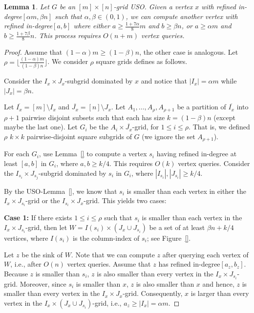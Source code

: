 \documentclass[a4paper,10pt]{article}
\newtheorem{lemma}{Lemma}
\newcommand{\indegree}{refined in-degree\xspace}
\begin{document}
\begin{lemma}\label{lemma:Constant fraction improvement}
Let $G$ be an $[m]\times[n]$-grid USO. 
Given a vertex $x$ with \indegree $[\alpha m, \beta n]$ such that $\alpha, \beta \in (0,1)$, we can compute another vertex with \indegree $[a,b]$ where either $a\geq \frac{1+7\alpha}{8}m$ and $b \geq \beta n$, or $a \geq \alpha m$ and $b \geq \frac{1 + 7\beta}{8}n$. This process requires $O(n + m)$ vertex queries.
\end{lemma}

\begin{proof}
Assume that $(1-\alpha) m \geq (1-\beta)n$, the other case is analogous. 
Let $\rho = \lfloor \frac{(1-\alpha)m}{(1-\beta)n} \rfloor$.
We consider $\rho$ square grids defines as follows. 

Consider the  $I_x\times J_x$-subgrid dominated by $x$ and 
notice that $|I_x| = \alpha m$ while $|J_x| = \beta n$.

Let $\overline{I_x} = [m]\setminus I_x$ and $\overline{J_x} = [n]\setminus J_x$.
Let $A_1, \ldots, A_\rho, A_{\rho+1}$ be a partition of $\overline{I_x}$ into $\rho+1$ pairwise disjoint subsets such that each has size $k = (1-\beta)n$ (except maybe the last one).
Let $G_i$ be the $A_i\times \overline{J_x}$-grid, for $1\leq i\leq \rho$. That is, we defined $\rho$ $k\times k$ pairwise-disjoint square subgrids of $G$ (we ignore the set $A_{\rho+1}$).

For each $G_i$, use Lemma~\ref{} to compute a vertex $s_i$ having \indegree at least $[a,b]$ in $G_i$, where $a,b \geq k/4$.
This requires $O(k)$ vertex queries. 
Consider the $I_{s_i}\times J_{s_j}$-subgrid dominated by $s_i$ in $G_i$, where $|I_{s_i}|, |J_{s_i}| \geq k/4$.

By the USO-Lemma~\ref{}, we know that $s_i$ is smaller than each vertex in either the $I_x\times J_{s_i}$-grid or the $I_{s_i}\times J_x$-grid. This yields two cases:

\textbf{Case 1:} If there exists $1\leq i \leq \rho$ such that
$s_i$ is smaller than each vertex in the $I_x\times J_{s_i}$-grid, then let $W =  I(s_i) \times (J_x\cup J_{s_i})$ be a set of at least $\beta n + k/4$ vertices, where $I(s_i)$ is the column-index of $s_i$; see Figure~\ref{}. 

Let $z$ be the sink of $W$. Note that we can compute $z$ after querying each vertex of $W$, i.e., after $O(n)$ vertex queries. Assume that $z$ has \indegree $[a_z, b_z]$. 
Because $z$ is smaller than $s_i$, $z$ is also smaller than every vertex in the $I_x\times J_{s_i}$-grid. Moreover, since $s_i$ is smaller than $x$, $z$ is also smaller than $x$ and hence, $z$ is smaller than every vertex in the $I_x\times J_x$-grid.
Consequently, $x$ is larger than every vertex in the $I_x\times (J_x\cup J_{s_i})$-grid, i.e., $a_z\geq |I_x| = \alpha m$.


\end{proof}
\end{document}
